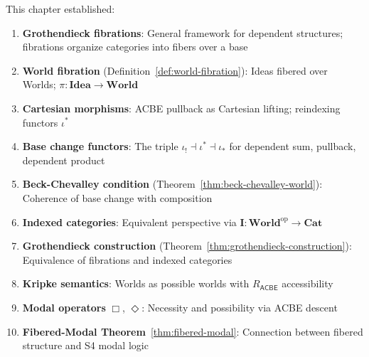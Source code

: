 \begin{remark}
\label{rem:ch6-summary}
This chapter established:
\begin{enumerate}
  \item \textbf{Grothendieck fibrations}: General framework for dependent structures;
        fibrations organize categories into fibers over a base
  \item \textbf{World fibration} (Definition~\ref{def:world-fibration}): Ideas fibered
        over Worlds; $\pi : \mathbf{Idea} \to \mathbf{World}$
  \item \textbf{Cartesian morphisms}: ACBE pullback as Cartesian lifting; reindexing
        functors $\iota^*$
  \item \textbf{Base change functors}: The triple $\iota_! \dashv \iota^* \dashv \iota_*$
        for dependent sum, pullback, dependent product
  \item \textbf{Beck-Chevalley condition} (Theorem~\ref{thm:beck-chevalley-world}):
        Coherence of base change with composition
  \item \textbf{Indexed categories}: Equivalent perspective via
        $\mathbf{I} : \mathbf{World}^{\mathrm{op}} \to \mathbf{Cat}$
  \item \textbf{Grothendieck construction} (Theorem~\ref{thm:grothendieck-construction}):
        Equivalence of fibrations and indexed categories
  \item \textbf{Kripke semantics}: Worlds as possible worlds with $R_{\mathsf{ACBE}}$
        accessibility
  \item \textbf{Modal operators} $\Box$, $\Diamond$: Necessity and possibility via
        ACBE descent
  \item \textbf{Fibered-Modal Theorem}~\ref{thm:fibered-modal}: Connection between
        fibered structure and S4 modal logic
\end{enumerate}
\end{remark}

